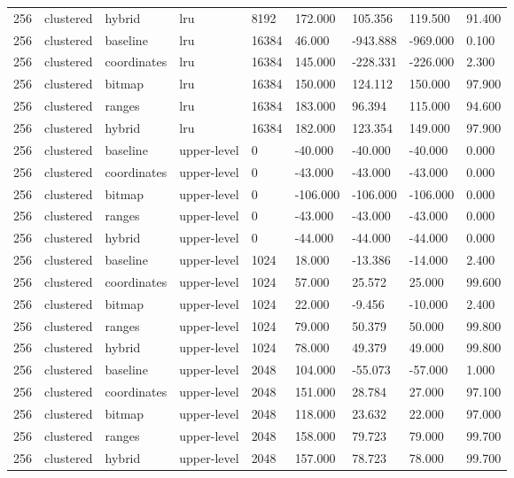 \begin{tabular}{lllllllll}
256 & clustered & hybrid & lru & 8192 & 172.000 & 105.356 & 119.500 & 91.400 \\
256 & clustered & baseline & lru & 16384 & 46.000 & -943.888 & -969.000 & 0.100 \\
256 & clustered & coordinates & lru & 16384 & 145.000 & -228.331 & -226.000 & 2.300 \\
256 & clustered & bitmap & lru & 16384 & 150.000 & 124.112 & 150.000 & 97.900 \\
256 & clustered & ranges & lru & 16384 & 183.000 & 96.394 & 115.000 & 94.600 \\
256 & clustered & hybrid & lru & 16384 & 182.000 & 123.354 & 149.000 & 97.900 \\
256 & clustered & baseline & upper-level & 0 & -40.000 & -40.000 & -40.000 & 0.000 \\
256 & clustered & coordinates & upper-level & 0 & -43.000 & -43.000 & -43.000 & 0.000 \\
256 & clustered & bitmap & upper-level & 0 & -106.000 & -106.000 & -106.000 & 0.000 \\
256 & clustered & ranges & upper-level & 0 & -43.000 & -43.000 & -43.000 & 0.000 \\
256 & clustered & hybrid & upper-level & 0 & -44.000 & -44.000 & -44.000 & 0.000 \\
256 & clustered & baseline & upper-level & 1024 & 18.000 & -13.386 & -14.000 & 2.400 \\
256 & clustered & coordinates & upper-level & 1024 & 57.000 & 25.572 & 25.000 & 99.600 \\
256 & clustered & bitmap & upper-level & 1024 & 22.000 & -9.456 & -10.000 & 2.400 \\
256 & clustered & ranges & upper-level & 1024 & 79.000 & 50.379 & 50.000 & 99.800 \\
256 & clustered & hybrid & upper-level & 1024 & 78.000 & 49.379 & 49.000 & 99.800 \\
256 & clustered & baseline & upper-level & 2048 & 104.000 & -55.073 & -57.000 & 1.000 \\
256 & clustered & coordinates & upper-level & 2048 & 151.000 & 28.784 & 27.000 & 97.100 \\
256 & clustered & bitmap & upper-level & 2048 & 118.000 & 23.632 & 22.000 & 97.000 \\
256 & clustered & ranges & upper-level & 2048 & 158.000 & 79.723 & 79.000 & 99.700 \\
256 & clustered & hybrid & upper-level & 2048 & 157.000 & 78.723 & 78.000 & 99.700 \\

\end{tabular}
